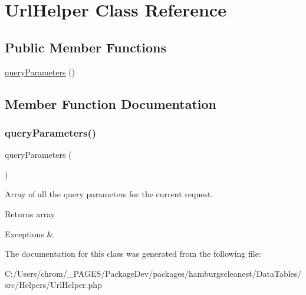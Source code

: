 \hypertarget{classhamburgscleanest_1_1_data_tables_1_1_helpers_1_1_url_helper}{}\section{Url\+Helper Class Reference}
\label{classhamburgscleanest_1_1_data_tables_1_1_helpers_1_1_url_helper}
\subsection*{Public Member Functions}
\begin{DoxyCompactItemize}
\item 
\hyperlink{classhamburgscleanest_1_1_data_tables_1_1_helpers_1_1_url_helper_acebf296a22e3b9068b929f030a1d0fcb}{query\+Parameters} ()
\end{DoxyCompactItemize}


\subsection{Member Function Documentation}
\mbox{\label{classhamburgscleanest_1_1_data_tables_1_1_helpers_1_1_url_helper_acebf296a22e3b9068b929f030a1d0fcb}} 
\subsubsection{\texorpdfstring{query\+Parameters()}{queryParameters()}}
{\footnotesize\ttfamily query\+Parameters (\begin{DoxyParamCaption}{ }\end{DoxyParamCaption})}

Array of all the query parameters for the current request.

\begin{DoxyReturn}{Returns}
array 
\end{DoxyReturn}

\begin{DoxyExceptions}{Exceptions}
{\em } & \\
\hline
\end{DoxyExceptions}


The documentation for this class was generated from the following file\+:\begin{DoxyCompactItemize}
\item 
C\+:/\+Users/chrom/\+\_\+\+P\+A\+G\+E\+S/\+Package\+Dev/packages/hamburgscleanest/\+Data\+Tables/src/\+Helpers/Url\+Helper.\+php\end{DoxyCompactItemize}
